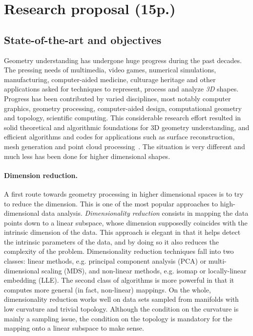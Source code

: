 \section{Research proposal (15p.)}

\subsection{State-of-the-art and objectives}

Geometry understanding has undergone huge progress during the past decades. The pressing needs
of multimedia, video games, numerical simulations, manufacturing, computer-aided medicine, culturage heritage and other applications asked for techniques to represent, process and analyze
{\em 3D} shapes.  Progress has been contributed by  varied disciplines, most notably computer graphics, geometry processing, computer-aided design, computational geometry and topology, scientific computing. This considerable research effort resulted in solid theoretical and algorithmic foundations for 3D geometry understanding, and efficient algorithms and codes for applications such as surface reconstruction, mesh generation and point cloud processing~\cite{geometrica-bcmrv-ms-06,dey-csr-2007}.  
The situation is very different and much less has been done for higher dimensional shapes.%


\paragraph{Dimension reduction.} A first route towards geometry processing in higher dimensional spaces is to try to reduce the dimension. This is 
one of the most popular approaches to high-dimensional data analysis. {\em Dimensionality reduction} consists in mapping the data points down to a linear subspace, whose dimension supposedly coincides with the intrinsic dimension of the data. This approach is elegant in that it helps detect the intrinsic parameters of the data, and by doing so it also reduces the complexity of the problem. Dimensionality reduction techniques fall into two classes: linear methods, e.g. principal component analysis (PCA) or multi-dimensional scaling (MDS), and non-linear methods, e.g. isomap or locally-linear embedding (LLE). The second class of algorithms is more powerful in that it computes more general (in fact, non-linear) mappings. On the whole, dimensionality reduction works well on data sets sampled from manifolds with low curvature and trivial topology. Although the condition on the curvature is mainly a sampling issue, the condition on the topology is mandatory for the mapping onto a linear subspace to make sense. 

